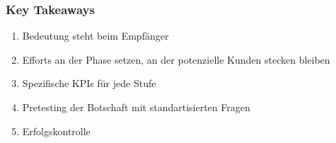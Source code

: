 \subsubsection{Key Takeaways}

\begin{enumerate}
    \item Bedeutung steht beim Empfänger
    \item Efforts an der Phase setzen, an der potenzielle Kunden stecken bleiben
    \item Spezifische KPIs für jede Stufe  
    \item Pretesting der Botschaft mit standartisierten Fragen
    \item Erfolgskontrolle
\end{enumerate}


